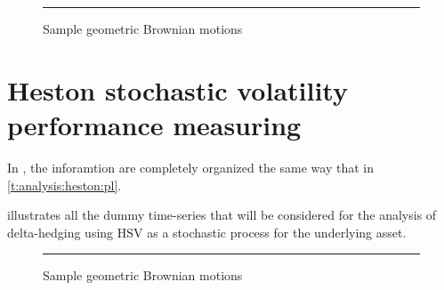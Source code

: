 \documentclass[12pt]{report}
\begin{document}
\begin{figure}[h]
  \centering
  \rule{40mm}{20mm}
  \caption{Sample geometric Brownian motions}
  \label{p:analysis:mjd:hedge:deltas}
\end{figure}






\section{Heston stochastic volatility performance measuring}
\label{sec:section name}


In , the inforamtion are completely organized the same way that in \cref{t:analysis:heston:pl}.

 illustrates all the dummy time-series that will be considered for the analysis of delta-hedging using HSV as a stochastic process for the underlying asset.


\begin{figure}[ht]
  \centering
  \rule{40mm}{20mm}
  \caption{Sample geometric Brownian motions}
  \label{p:analysis:mjd:100}
\end{figure}
\end{document}
